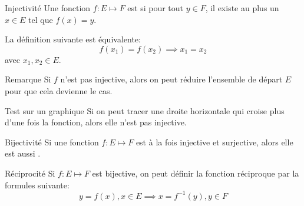 \documentclass[a4paper]{article}
\begin{document}
\begin{parag}{Injectivité}
    Une fonction $f: E \mapsto F$ est  si pour tout $y \in F$, il existe au plus un $x \in E$ tel que $f\left(x\right) = y$.

    La définition suivante est équivalente:
    \[f\left(x_1\right) = f\left(x_2\right) \implies x_1 = x_2\]
    avec $x_1, x_2 \in E$.

    \begin{subparag}{Remarque}
        Si $f$ n'est pas injective, alors on peut réduire l'ensemble de départ $E$ pour que cela devienne le cas.
    \end{subparag}

    \begin{subparag}{Test sur un graphique}
        Si on peut tracer une droite horizontale qui croise plus d'une fois la fonction, alors elle n'est pas injective.
    \end{subparag}
\end{parag}

\begin{parag}{Bijectivité}
    Si une fonction $f: E \mapsto F$ est à la fois injective et surjective, alors elle est aussi . 
\end{parag}

\begin{parag}{Réciprocité}
    Si $f: E \mapsto F$ est bijective, on peut définir la fonction réciproque par la formules suivante: 
    \[y = f\left(x\right), x \in E \implies x = f^{-1}\left(y\right), y \in F\]
\end{parag}
\end{document}
